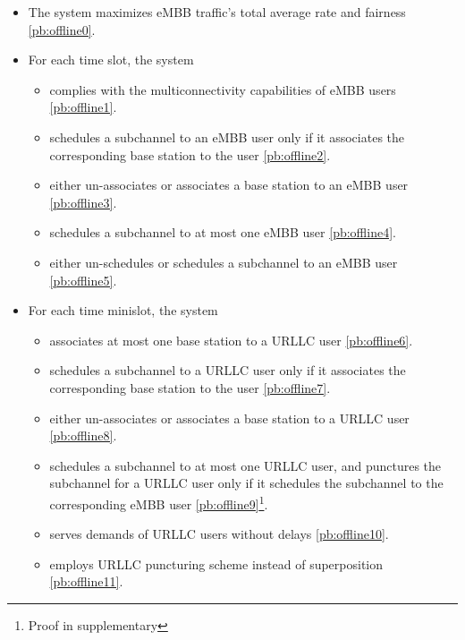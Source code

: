 \begin{frame}
  \begin{itemize}
    \item The system maximizes eMBB traffic's total average rate and fairness \eqref{pb:offline0}.
    \item For each time slot, the system
      \begin{itemize}
        \item complies with the multiconnectivity capabilities of eMBB users \eqref{pb:offline1}.
        \item schedules a subchannel to an eMBB user only if it associates the corresponding base station to the user \eqref{pb:offline2}.
        \item either un-associates or associates a base station to an eMBB user \eqref{pb:offline3}.
        \item schedules a subchannel to at most one eMBB user \eqref{pb:offline4}.
        \item either un-schedules or schedules a subchannel to an eMBB user \eqref{pb:offline5}.
      \end{itemize}
  \end{itemize}
\end{frame}

\begin{frame}
  \begin{itemize}
    \item For each time minislot, the system
      \begin{itemize}
        \item associates at most one base station to a URLLC user \eqref{pb:offline6}.
        \item schedules a subchannel to a URLLC user only if it associates the corresponding base station to the user \eqref{pb:offline7}.
        \item either un-associates or associates a base station to a URLLC user \eqref{pb:offline8}.
        \item schedules a subchannel to at most one URLLC user, and punctures the subchannel for a URLLC user only if it schedules the subchannel to the corresponding eMBB user \eqref{pb:offline9}\footnote{Proof in supplementary}.
        \item serves demands of URLLC users without delays \eqref{pb:offline10}.
        \item employs URLLC puncturing scheme instead of superposition \eqref{pb:offline11}.
      \end{itemize}
  \end{itemize}
\end{frame}
